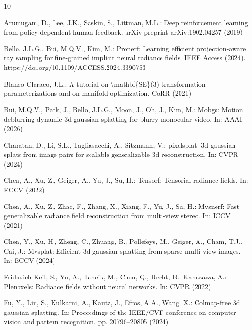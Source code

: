 \documentclass[runningheads]{llncs}
\begin{document}
\clearpage

\begin{thebibliography}{10}
\providecommand{\url}[1]{\texttt{#1}}
\providecommand{\urlprefix}{URL }
\providecommand{\doi}[1]{https://doi.org/#1}

Arumugam, D., Lee, J.K., Saskin, S., Littman, M.L.: Deep reinforcement learning from policy-dependent human feedback. arXiv preprint arXiv:1902.04257  (2019)

Bello, J.L.G., Bui, M.Q.V., Kim, M.: Pronerf: Learning efficient projection-aware ray sampling for fine-grained implicit neural radiance fields. IEEE Access  (2024). \doi{10.1109/ACCESS.2024.3390753}

Blanco{-}Claraco, J.L.: A tutorial on {\textdollar}{\textbackslash}mathbf\{SE\}(3){\textdollar} transformation parameterizations and on-manifold optimization. CoRR  (2021)

Bui, M.Q.V., Park, J., Bello, J.L.G., Moon, J., Oh, J., Kim, M.: Mobgs: Motion deblurring dynamic 3d gaussian splatting for blurry monocular video. In: AAAI (2026)

Charatan, D., Li, S.L., Tagliasacchi, A., Sitzmann, V.: pixelsplat: 3d gaussian splats from image pairs for scalable generalizable 3d reconstruction. In: CVPR (2024)

Chen, A., Xu, Z., Geiger, A., Yu, J., Su, H.: Tensorf: Tensorial radiance fields. In: ECCV (2022)

Chen, A., Xu, Z., Zhao, F., Zhang, X., Xiang, F., Yu, J., Su, H.: Mvsnerf: Fast generalizable radiance field reconstruction from multi-view stereo. In: ICCV (2021)

Chen, Y., Xu, H., Zheng, C., Zhuang, B., Pollefeys, M., Geiger, A., Cham, T.J., Cai, J.: Mvsplat: Efficient 3d gaussian splatting from sparse multi-view images. In: ECCV (2024)

Fridovich-Keil, S., Yu, A., Tancik, M., Chen, Q., Recht, B., Kanazawa, A.: Plenoxels: Radiance fields without neural networks. In: CVPR (2022)

Fu, Y., Liu, S., Kulkarni, A., Kautz, J., Efros, A.A., Wang, X.: Colmap-free 3d gaussian splatting. In: Proceedings of the IEEE/CVF conference on computer vision and pattern recognition. pp. 20796--20805 (2024)


\end{thebibliography}
\end{document}

